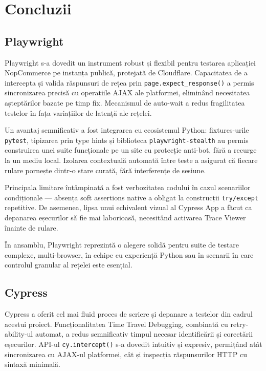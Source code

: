 \chapter{Concluzii}

\section{Playwright}

Playwright s-a dovedit un instrument robust și flexibil pentru testarea aplicației
NopCommerce pe instanța publică, protejată de Cloudflare. Capacitatea de a intercepta
și valida răspunsuri de rețea prin \texttt{page.expect\_response()} a permis
sincronizarea precisă cu operațiile AJAX ale platformei, eliminând necesitatea
așteptărilor bazate pe timp fix. Mecanismul de auto-wait a redus fragilitatea testelor
în fața variațiilor de latență ale rețelei.

Un avantaj semnificativ a fost integrarea cu ecosistemul Python: fixtures-urile
\texttt{pytest}, tipizarea prin type hints și biblioteca \texttt{playwright-stealth}
au permis construirea unei suite funcționale pe un site cu protecție anti-bot, fără
a recurge la un mediu local. Izolarea contextuală automată între teste a asigurat
că fiecare rulare pornește dintr-o stare curată, fără interferențe de sesiune.

Principala limitare întâmpinată a fost verbozitatea codului în cazul scenariilor
condiționale --- absența soft assertions native a obligat la construcții
\texttt{try/except} repetitive. De asemenea, lipsa unui echivalent vizual al
Cypress App a făcut ca depanarea eșecurilor să fie mai laborioasă, necesitând
activarea Trace Viewer înainte de rulare.

În ansamblu, Playwright reprezintă o alegere solidă pentru suite de testare
complexe, multi-browser, în echipe cu experiență Python sau în scenarii în care
controlul granular al rețelei este esențial.

\section{Cypress}

Cypress a oferit cel mai fluid proces de scriere și depanare a testelor din cadrul
acestui proiect. Funcționalitatea Time Travel Debugging, combinată cu retry-ability-ul
automat, a redus semnificativ timpul necesar identificării și corectării eșecurilor.
API-ul \texttt{cy.intercept()} s-a dovedit intuitiv și expresiv, permițând atât
sincronizarea cu AJAX-ul platformei, cât și inspecția răspunsurilor HTTP cu
sintaxă minimală.

